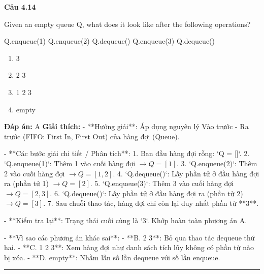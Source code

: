 \documentclass[11pt,a4paper]{article}
\newenvironment{question}[1]{%
  \par\vspace{1em}\noindent\textbf{\large Câu #1}\par\vspace{0.4em}
}{%
  \par\vspace{1em}\hrule\vspace{0.6em}
}
\newenvironment{choices}{%
  \begin{enumerate}[label=\textbf{\Alph*.},leftmargin=2.2em,itemsep=2pt,topsep=3pt]
}{%
  \end{enumerate}
}
\newcommand{\choice}{\item}
\newenvironment{codebox}{%
  \begin{tcolorbox}[colback=gray!8!white,colframe=gray!50!black,arc=1.5mm,boxrule=0.6pt,left=3mm,right=3mm,top=2.5mm,bottom=2.5mm]
  \ttfamily\small
}{%
  \end{tcolorbox}
}
\begin{document}
\begin{question}{4.14}
Given an empty queue Q, what does it look like after the following operations?
\begin{codebox}
Q.enqueue(1)
Q.enqueue(2)
Q.dequeue()
Q.enqueue(3)
Q.dequeue()
\end{codebox}
\begin{choices}
\choice 3
\choice 2 3
\choice 1 2 3
\choice empty
\end{choices}
\textbf{Đáp án:} A
\textbf{Giải thích:} - **Hướng giải**:
  Áp dụng nguyên lý Vào trước - Ra trước (FIFO: First In, First Out) của hàng đợi (Queue).

- **Các bước giải chi tiết / Phân tích**:
  1. Ban đầu hàng đợi rỗng: `Q = []`.
  2. `Q.enqueue(1)`: Thêm 1 vào cuối hàng đợi \(\rightarrow Q = [1]\).
  3. `Q.enqueue(2)`: Thêm 2 vào cuối hàng đợi \(\rightarrow Q = [1, 2]\).
  4. `Q.dequeue()`: Lấy phần tử ở đầu hàng đợi ra (phần tử 1) \(\rightarrow Q = [2]\).
  5. `Q.enqueue(3)`: Thêm 3 vào cuối hàng đợi \(\rightarrow Q = [2, 3]\).
  6. `Q.dequeue()`: Lấy phần tử ở đầu hàng đợi ra (phần tử 2) \(\rightarrow Q = [3]\).
  7. Sau chuỗi thao tác, hàng đợi chỉ còn lại duy nhất phần tử **3**.

- **Kiểm tra lại**:
  Trạng thái cuối cùng là `3`. Khớp hoàn toàn phương án A.

- **Vì sao các phương án khác sai**:
  - **B. 2 3**: Bỏ qua thao tác dequeue thứ hai.
  - **C. 1 2 3**: Xem hàng đợi như danh sách tích lũy không có phần tử nào bị xóa.
  - **D. empty**: Nhầm lẫn số lần dequeue với số lần enqueue.
\end{question}
\end{document}
